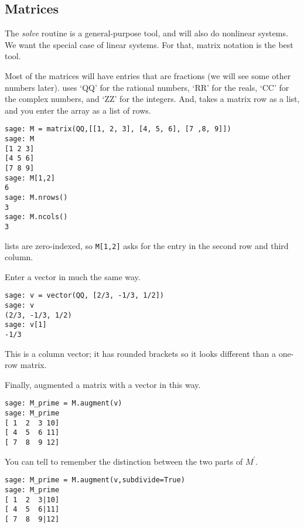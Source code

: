 \subsection{Matrices}
The \textit{solve} routine is a general-purpose tool, and will also 
do nonlinear systems. 
We want the special case of linear systems.
For that, matrix notation is the best tool.
 
Most of the matrices will have entries that are fractions
(we will see some other numbers later).
\Sage{} uses `QQ' for the rational numbers,
`RR' for the reals,
`CC' for the complex numbers,
and
`ZZ' for the integers.
And, \Sage{} takes a matrix row as a list, and
you enter the array as a list of rows.
\begin{lstlisting}[style=python]
sage: M = matrix(QQ,[[1, 2, 3], [4, 5, 6], [7 ,8, 9]])
sage: M
[1 2 3]
[4 5 6]
[7 8 9]
sage: M[1,2]
6
sage: M.nrows()
3
sage: M.ncols()
3
\end{lstlisting}
\Sage{} lists are zero-indexed, so \lstinline[style=inline]!M[1,2]! asks
for the entry in the second row and third column. 

Enter a vector in much the same way.
\begin{lstlisting}[style=python]
sage: v = vector(QQ, [2/3, -1/3, 1/2])
sage: v
(2/3, -1/3, 1/2)
sage: v[1]
-1/3
\end{lstlisting}
This is a column vector; 
it has rounded brackets so it looks different than a one-row matrix.

Finally, augmented a matrix with a vector in this way.
\begin{lstlisting}[style=python]
sage: M_prime = M.augment(v)
sage: M_prime
[ 1  2  3 10]
[ 4  5  6 11]
[ 7  8  9 12]  
\end{lstlisting}
You can tell \Sage{} to remember the distinction between the two parts 
of $M^\prime$.
\begin{lstlisting}[style=python]
sage: M_prime = M.augment(v,subdivide=True)
sage: M_prime                              
[ 1  2  3|10]
[ 4  5  6|11]
[ 7  8  9|12] 
\end{lstlisting}



